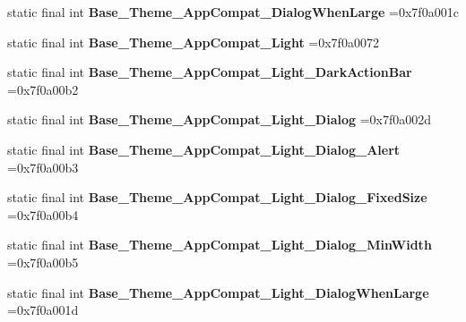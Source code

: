 \begin{DoxyCompactItemize}
\mbox{\label{classproject4_1_1xaria_1_1R_1_1style_af7e16b3a4e3c840011ab98466df2bd3a}} 
static final int {\bfseries Base\+\_\+\+Theme\+\_\+\+App\+Compat\+\_\+\+Dialog\+When\+Large} =0x7f0a001c
\item 
\mbox{\label{classproject4_1_1xaria_1_1R_1_1style_acc5290691f0f05f036e67462cb6464f8}} 
static final int {\bfseries Base\+\_\+\+Theme\+\_\+\+App\+Compat\+\_\+\+Light} =0x7f0a0072
\item 
\mbox{\label{classproject4_1_1xaria_1_1R_1_1style_a0a928d9f92ec9a2d275866098f69e876}} 
static final int {\bfseries Base\+\_\+\+Theme\+\_\+\+App\+Compat\+\_\+\+Light\+\_\+\+Dark\+Action\+Bar} =0x7f0a00b2
\item 
\mbox{\label{classproject4_1_1xaria_1_1R_1_1style_a662920fa8d8f2884e31f9b5bf5d8e7ca}} 
static final int {\bfseries Base\+\_\+\+Theme\+\_\+\+App\+Compat\+\_\+\+Light\+\_\+\+Dialog} =0x7f0a002d
\item 
\mbox{\label{classproject4_1_1xaria_1_1R_1_1style_a5bb2247bd2d4af6c461a0178c95b3d4b}} 
static final int {\bfseries Base\+\_\+\+Theme\+\_\+\+App\+Compat\+\_\+\+Light\+\_\+\+Dialog\+\_\+\+Alert} =0x7f0a00b3
\item 
\mbox{\label{classproject4_1_1xaria_1_1R_1_1style_ae75109850a18700a6112b7cf408a47b9}} 
static final int {\bfseries Base\+\_\+\+Theme\+\_\+\+App\+Compat\+\_\+\+Light\+\_\+\+Dialog\+\_\+\+Fixed\+Size} =0x7f0a00b4
\item 
\mbox{\label{classproject4_1_1xaria_1_1R_1_1style_ab2c526184fb1dd15835474a261d39eb6}} 
static final int {\bfseries Base\+\_\+\+Theme\+\_\+\+App\+Compat\+\_\+\+Light\+\_\+\+Dialog\+\_\+\+Min\+Width} =0x7f0a00b5
\item 
\mbox{\label{classproject4_1_1xaria_1_1R_1_1style_a9869b51a938462286ee52f09ab217d8e}} 
static final int {\bfseries Base\+\_\+\+Theme\+\_\+\+App\+Compat\+\_\+\+Light\+\_\+\+Dialog\+When\+Large} =0x7f0a001d
\item 

\end{DoxyCompactItemize}
